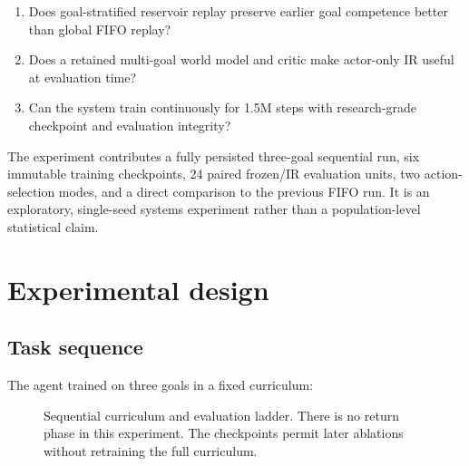 \documentclass[10pt]{article}
\begin{document}
\begin{enumerate}
  \item Does goal-stratified reservoir replay preserve earlier goal competence better than global FIFO replay?
  \item Does a retained multi-goal world model and critic make actor-only IR useful at evaluation time?
  \item Can the system train continuously for 1.5M steps with research-grade checkpoint and evaluation integrity?
\end{enumerate}

The experiment contributes a fully persisted three-goal sequential run, six immutable training checkpoints, 24 paired frozen/IR evaluation units, two action-selection modes, and a direct comparison to the previous FIFO run. It is an exploratory, single-seed systems experiment rather than a population-level statistical claim.

\section{Experimental design}

\subsection{Task sequence}

The agent trained on three goals in a fixed curriculum:

\begin{figure}[H]
\centering
{}
\caption{Sequential curriculum and evaluation ladder. There is no return phase in this experiment. The checkpoints permit later ablations without retraining the full curriculum.}
\label{fig:timeline}
\end{figure}
\end{document}
